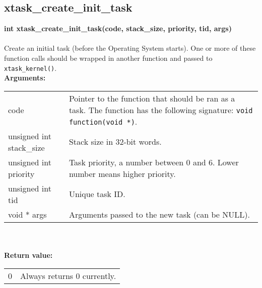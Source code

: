 \begin{samepage}
\subsection{xtask\_create\_init\_task}
\noindent
\textbf{int xtask\_create\_init\_task(code, stack\_size, priority, tid, args)}\\\\
Create an initial task (before the Operating System starts). One or more of these
function calls should be wrapped in another function and passed to 
\verb|xtask_kernel()|.\\

\noindent
\textbf{Arguments:}\\
\indent\begin{tabular}{ p{4.5cm}  p{9cm} }
code                     & Pointer to the function that should be ran as a task.
                           The function has the following signature: 
                           \verb|void function(void *)|.\\
unsigned int stack\_size & Stack size in 32-bit words.\\
unsigned int priority    & Task priority, a number between 0 and 6. Lower number
                           means higher priority.\\
unsigned int tid         & Unique task ID.\\
void * args              & Arguments passed to the new task (can be NULL).
\end{tabular}\\\\

\noindent
\textbf{Return value:}\\
\indent\begin{tabular}{  p{4.5cm}  p{9cm} }
0 & Always returns 0 currently. \\
\end{tabular}
\end{samepage}

